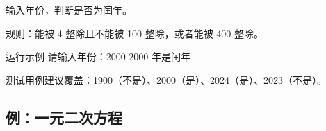 \begin{example}
输入年份，判断是否为闰年。
\end{example}
\begin{solution}
规则：能被 4 整除且不能被 100 整除，或者能被 400 整除。


\begin{outbox}{运行示例}
请输入年份：2000
2000 年是闰年
\end{outbox}

测试用例建议覆盖：1900（不是）、2000（是）、2024（是）、2023（不是）。
\end{solution}

\subsection{例：一元二次方程}

